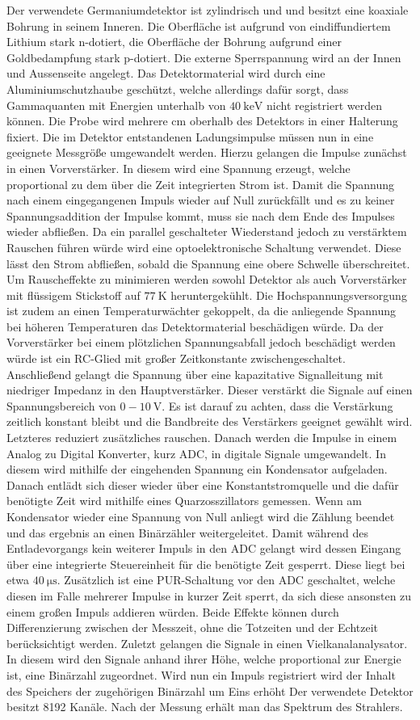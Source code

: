 Der verwendete Germaniumdetektor ist zylindrisch und und besitzt eine koaxiale Bohrung in seinem Inneren. Die Oberfläche ist aufgrund von eindiffundiertem Lithium stark n-dotiert, die Oberfläche der Bohrung aufgrund einer Goldbedampfung stark p-dotiert. Die externe Sperrspannung wird an der Innen und Aussenseite angelegt. Das Detektormaterial wird durch eine Aluminiumschutzhaube geschützt, welche allerdings dafür sorgt, dass Gammaquanten mit Energien unterhalb von $\SI{40}{\kilo\electronvolt}$ nicht registriert werden können. Die Probe wird mehrere $\si{\centi\meter}$ oberhalb des Detektors in einer Halterung fixiert. Die im Detektor entstandenen Ladungsimpulse müssen nun in eine geeignete Messgröße umgewandelt werden. Hierzu gelangen die Impulse zunächst in einen Vorverstärker. In diesem wird eine Spannung erzeugt, welche proportional zu dem über die Zeit integrierten Strom ist. Damit die Spannung nach einem eingegangenen Impuls wieder auf Null zurückfällt und es zu keiner Spannungsaddition der Impulse kommt, muss sie nach dem Ende des Impulses wieder abfließen. Da ein parallel geschalteter Wiederstand jedoch zu verstärktem Rauschen führen würde wird eine optoelektronische Schaltung verwendet. Diese lässt den Strom abfließen, sobald die Spannung eine obere Schwelle überschreitet. Um Rauscheffekte zu minimieren werden sowohl Detektor als auch Vorverstärker mit flüssigem Stickstoff auf $\SI{77}{\kelvin}$ heruntergekühlt. Die Hochspannungsversorgung ist zudem an einen Temperaturwächter gekoppelt, da die anliegende Spannung bei höheren Temperaturen das Detektormaterial beschädigen würde. Da der Vorverstärker bei einem plötzlichen Spannungsabfall jedoch beschädigt werden würde ist ein RC-Glied mit großer Zeitkonstante zwischengeschaltet. Anschließend gelangt die Spannung über eine kapazitative Signalleitung mit niedriger Impedanz in den Hauptverstärker. Dieser verstärkt die Signale auf einen Spannungsbereich von $0 - \SI{10}{\volt}$. Es ist darauf zu achten, dass die Verstärkung zeitlich konstant bleibt und die Bandbreite des Verstärkers geeignet gewählt wird. Letzteres reduziert zusätzliches rauschen. Danach werden die Impulse in einem Analog zu Digital Konverter, kurz ADC, in digitale Signale umgewandelt. In diesem wird mithilfe der eingehenden Spannung ein Kondensator aufgeladen. Danach entlädt sich dieser wieder über eine Konstantstromquelle und die dafür benötigte Zeit wird mithilfe eines Quarzosszillators gemessen. Wenn am Kondensator wieder eine Spannung von Null anliegt wird die Zählung beendet und das ergebnis an einen Binärzähler weitergeleitet. Damit während des Entladevorgangs kein weiterer Impuls in den ADC gelangt wird dessen Eingang über eine integrierte Steuereinheit für die benötigte Zeit gesperrt. Diese liegt bei etwa $\SI{40}{\micro\second}$. Zusätzlich ist eine PUR-Schaltung vor den ADC geschaltet, welche diesen im Falle mehrerer Impulse in kurzer Zeit sperrt, da sich diese ansonsten zu einem großen Impuls addieren würden. Beide Effekte können durch Differenzierung zwischen der Messzeit, ohne die Totzeiten und der Echtzeit berücksichtigt werden. Zuletzt gelangen die Signale in einen Vielkanalanalysator. In diesem wird den Signale anhand ihrer Höhe, welche proportional zur Energie ist, eine Binärzahl zugeordnet. Wird nun ein Impuls registriert wird der Inhalt des Speichers der zugehörigen Binärzahl um Eins erhöht Der verwendete Detektor besitzt 8192 Kanäle. Nach der Messung erhält man das Spektrum des Strahlers.